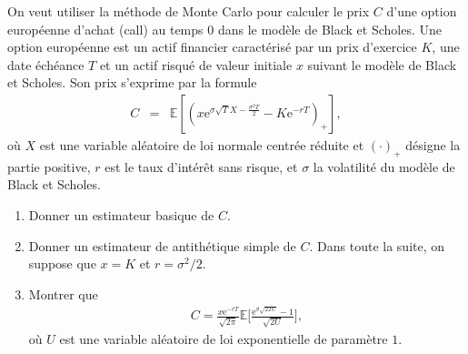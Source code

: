 \documentclass[11pt]{td_um}
\begin{document}
\begin{exo}{} %
    On veut utiliser la m\'ethode de Monte Carlo pour calculer le prix $C$ d'une option européenne d'achat (call) au temps 0 dans le mod\`ele de Black et Scholes. Une option européenne est un actif financier caractérisé par un prix d'exercice $K$, une date échéance $T$ et un actif risqué de valeur initiale $x$ suivant le mod\`ele de Black et Scholes. Son prix s'exprime par la formule
    \begin{eqnarray*}
        C&=&\mathbb{E}\left[\left(x\mathrm{e}^{\sigma\sqrt{T}X-\frac{\sigma^2T}{2}}-K\mathrm{e}^{-rT}\right)_+\right],
    \end{eqnarray*}
    où $X$ est une variable al\'eatoire de loi normale centr\'ee r\'eduite et $(\cdot)_+$ désigne la partie positive,
    $r$ est le taux d'intérêt sans risque, et $\sigma$ la volatilité du modèle de Black et Scholes. 
    \begin{enumerate}
        \item Donner un estimateur basique de $C$.
        \item Donner un estimateur de antithétique simple de $C$.
            Dans toute la suite, on suppose que $x=K$ et $r=\sigma^2/2$.
        \item  Montrer que 
            \begin{align*}
                C=\frac{x\mathrm{e}^{-rT}}{\sqrt{2\pi}}\mathbb{E}\Big[\frac{\mathrm{e}^{\sigma\sqrt{2TU}}-1}{\sqrt{2U}}\Big],
            \end{align*}
            o\`u $U$ est une variable al\'eatoire de loi exponentielle de param\`etre $1$.


\end{enumerate}
\end{exo}
\end{document}
